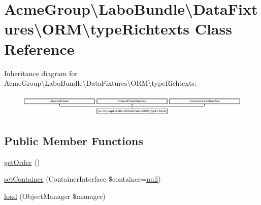 \hypertarget{class_acme_group_1_1_labo_bundle_1_1_data_fixtures_1_1_o_r_m_1_1type_richtexts}{\section{Acme\+Group\textbackslash{}Labo\+Bundle\textbackslash{}Data\+Fixtures\textbackslash{}O\+R\+M\textbackslash{}type\+Richtexts Class Reference}
\label{class_acme_group_1_1_labo_bundle_1_1_data_fixtures_1_1_o_r_m_1_1type_richtexts}
}
Inheritance diagram for Acme\+Group\textbackslash{}Labo\+Bundle\textbackslash{}Data\+Fixtures\textbackslash{}O\+R\+M\textbackslash{}type\+Richtexts\+:\begin{figure}[H]
\begin{center}
\leavevmode
\includegraphics[height=1.085271cm]{class_acme_group_1_1_labo_bundle_1_1_data_fixtures_1_1_o_r_m_1_1type_richtexts}
\end{center}
\end{figure}
\subsection*{Public Member Functions}
\begin{DoxyCompactItemize}
\item 
\hyperlink{class_acme_group_1_1_labo_bundle_1_1_data_fixtures_1_1_o_r_m_1_1type_richtexts_aac71ad7c4c1406aa41b1519798607bc5}{get\+Order} ()
\item 
\hyperlink{class_acme_group_1_1_labo_bundle_1_1_data_fixtures_1_1_o_r_m_1_1type_richtexts_aafa33012df85eb493ff411371d678db7}{set\+Container} (Container\+Interface \$container=\hyperlink{validate_8js_afb8e110345c45e74478894341ab6b28e}{null})
\item 
\hyperlink{class_acme_group_1_1_labo_bundle_1_1_data_fixtures_1_1_o_r_m_1_1type_richtexts_ae8fa71a5bab73fb657e63988574ddcd3}{load} (Object\+Manager \$manager)
\end{DoxyCompactItemize}


